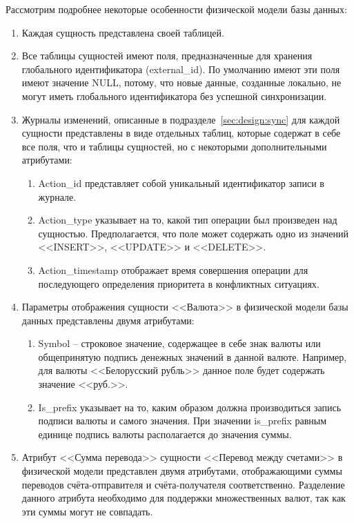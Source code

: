 Рассмотрим подробнее некоторые особенности физической модели базы данных:
\begin{enumerate}
    \item Каждая сущность представлена своей таблицей.
    \item Все таблицы сущностей имеют поля, предназначенные для хранения глобального идентификатора (external\_id).
    По умолчанию имеют эти поля имеют значение NULL, потому, что новые данные, созданные локально, не могут иметь глобального идентификатора без успешной синхронизации.
    \item Журналы изменений, описанные в подразделе~\ref{sec:design:sync} для каждой сущности представлены в виде отдельных таблиц, которые содержат в себе все поля, что и таблицы сущностей, но с некоторыми дополнительными атрибутами:
    \begin{enumerate}
        \item Action\_id представляет собой уникальный идентификатор записи в журнале.
        \item Action\_type указывает на то, какой тип операции был произведен над сущностью.
        Предполагается, что поле может содержать одно из значений <<INSERT>>, <<UPDATE>> и <<DELETE>>.
        \item Action\_timestamp отображает время совершения операции для последующего определения приоритета в конфликтных ситуациях.
    \end{enumerate}
    \item Параметры отображения сущности <<Валюта>> в физической модели базы данных представлены двумя атрибутами:
    \begin{enumerate}
        \item Symbol -- строковое значение, содержащее в себе знак валюты или общепринятую подпись денежных значений в данной валюте.
        Например, для валюты <<Белорусский рубль>> данное поле будет содержать значение <<руб.>>.
        \item Is\_prefix указывает на то, каким образом должна производиться запись подписи валюты и самого значения.
        При значении is\_prefix равным единице подпись валюты располагается до значения суммы.
    \end{enumerate}
    \item Атрибут <<Сумма перевода>> сущности <<Перевод между счетами>> в физической модели представлен двумя атрибутами, отображающими суммы переводов счёта-отправителя и счёта-получателя соответственно.
    Разделение данного атрибута необходимо для поддержки множественных валют, так как эти суммы могут не совпадать.
\end{enumerate}

